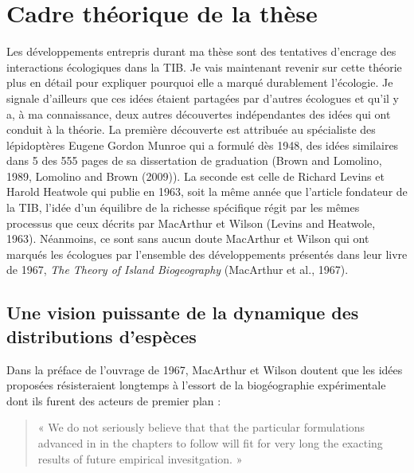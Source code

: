 \section*{Cadre théorique de la
thèse}\label{cadre-thuxe9orique-de-la-thuxe8se}

Les développements entrepris durant ma thèse sont des tentatives
d'encrage des interactions écologiques dans la TIB. Je vais maintenant
revenir sur cette théorie plus en détail pour expliquer pourquoi elle a
marqué durablement l'écologie. Je signale d'ailleurs que ces idées
étaient partagées par d'autres écologues et qu'il y a, à ma
connaissance, deux autres découvertes indépendantes des idées qui ont
conduit à la théorie. La première découverte est attribuée au
spécialiste des lépidoptères Eugene Gordon Munroe qui a formulé dès
1948, des idées similaires dans 5 des 555 pages de sa dissertation de
graduation (Brown and Lomolino, 1989, Lomolino and Brown (2009)). La
seconde est celle de Richard Levins et Harold Heatwole qui publie en
1963, soit la même année que l'article fondateur de la TIB, l'idée d'un
équilibre de la richesse spécifique régit par les mêmes processus que
ceux décrits par MacArthur et Wilson (Levins and Heatwole, 1963).
Néanmoins, ce sont sans aucun doute MacArthur et Wilson qui ont marqués
les écologues par l'ensemble des développements présentés dans leur
livre de 1967, \emph{The Theory of Island Biogeography} (MacArthur et
al., 1967).

\subsection*{Une vision puissante de la dynamique des distributions
d'espèces}\label{une-vision-puissante-de-la-dynamique-des-distributions-despuxe8ces}

Dans la préface de l'ouvrage de 1967, MacArthur et Wilson doutent que
les idées proposées résisteraient longtemps à l'essort de la
biogéographie expérimentale dont ils furent des acteurs de premier plan
:

\begin{quote}
« We do not seriously believe that that the particular formulations
advanced in in the chapters to follow will fit for very long the
exacting results of future empirical invesitgation. »
\end{quote}

